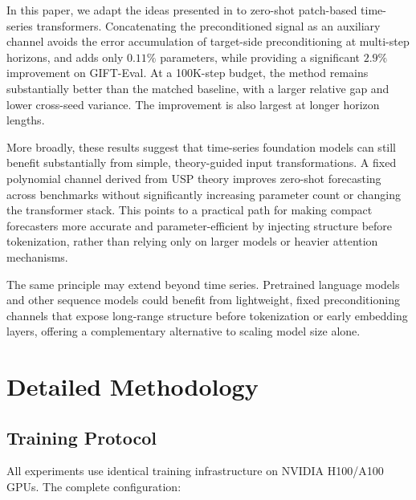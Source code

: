 \documentclass{article}
\begin{document}
In this paper, we adapt the ideas presented in \citet{marsden2024universal} to zero-shot patch-based time-series transformers. Concatenating the preconditioned signal as an auxiliary channel avoids the error accumulation of target-side preconditioning at multi-step horizons, and adds only $0.11\%$ parameters, while providing a significant $2.9\%$ improvement on GIFT-Eval. At a 100K-step budget, the method remains substantially better than the matched baseline, with a larger relative gap and lower cross-seed variance. The improvement is also largest at longer horizon lengths.

More broadly, these results suggest that time-series foundation models can still benefit substantially from simple, theory-guided input transformations. A fixed polynomial channel derived from USP theory improves zero-shot forecasting across benchmarks without significantly increasing parameter count or changing the transformer stack. This points to a practical path for making compact forecasters more accurate and parameter-efficient by injecting structure before tokenization, rather than relying only on larger models or heavier attention mechanisms.

The same principle may extend beyond time series. Pretrained language models and other sequence models could benefit from lightweight, fixed preconditioning channels that expose long-range structure before tokenization or early embedding layers, offering a complementary alternative to scaling model size alone.




\newpage
\appendix

\section{Detailed Methodology}
\label{app:methodology}

\subsection{Training Protocol}

All experiments use identical training infrastructure on NVIDIA H100/A100 GPUs. The complete configuration:
\end{document}
